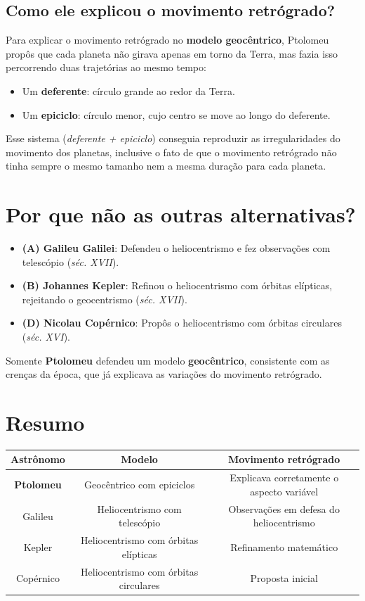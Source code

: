 \documentclass[a4paper,12pt]{article}
\begin{document}
\begin{flushleft}
\subsection*{Como ele explicou o movimento retrógrado?}
Para explicar o movimento retrógrado no \textbf{modelo geocêntrico}, Ptolomeu propôs que cada planeta não girava apenas em torno da Terra, mas fazia isso percorrendo duas trajetórias ao mesmo tempo:
\begin{itemize}
    \item Um \textbf{deferente}: círculo grande ao redor da Terra.
    \item Um \textbf{epiciclo}: círculo menor, cujo centro se move ao longo do deferente.
\end{itemize}

Esse sistema (\textit{deferente + epiciclo}) conseguia reproduzir as irregularidades do movimento dos planetas, inclusive o fato de que o movimento retrógrado não tinha sempre o mesmo tamanho nem a mesma duração para cada planeta.

\section*{Por que não as outras alternativas?}

\begin{itemize}
    \item \textbf{(A) Galileu Galilei}: Defendeu o heliocentrismo e fez observações com telescópio (\textit{séc. XVII}).
    \item \textbf{(B) Johannes Kepler}: Refinou o heliocentrismo com órbitas elípticas, rejeitando o geocentrismo (\textit{séc. XVII}).
    \item \textbf{(D) Nicolau Copérnico}: Propôs o heliocentrismo com órbitas circulares (\textit{séc. XVI}).
\end{itemize}

Somente \textbf{Ptolomeu} defendeu um modelo \textbf{geocêntrico}, consistente com as crenças da época, que já explicava as variações do movimento retrógrado.

\section*{Resumo}

\begin{center}
\small
\begin{tabular}{|c|c|c|}
\hline
\textbf{Astrônomo} & \textbf{Modelo} & \textbf{Movimento retrógrado} \\
\hline
\textbf{Ptolomeu} & Geocêntrico com epiciclos & Explicava corretamente o aspecto variável \\
\hline
Galileu & Heliocentrismo com telescópio & Observações em defesa do heliocentrismo \\
\hline
Kepler & Heliocentrismo com órbitas elípticas & Refinamento matemático \\
\hline
Copérnico & Heliocentrismo com órbitas circulares & Proposta inicial \\
\hline
\end{tabular}
\end{center}



\end{flushleft}
\end{document}
